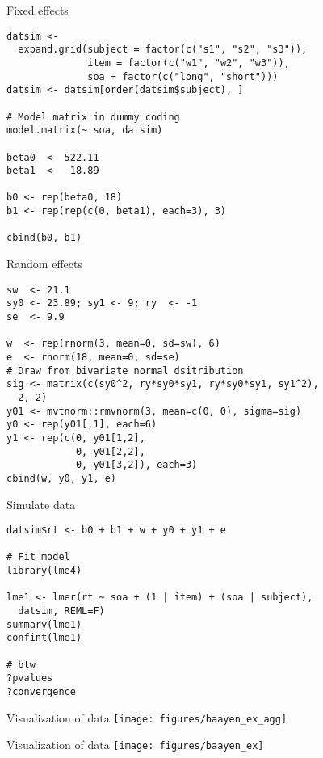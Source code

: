 \documentclass{beamer}
\begin{document}
{

\begin{frame}[fragile]{Fixed effects}
  \begin{lstlisting}
datsim <- 
  expand.grid(subject = factor(c("s1", "s2", "s3")),
              item = factor(c("w1", "w2", "w3")),
              soa = factor(c("long", "short")))
datsim <- datsim[order(datsim$subject), ]

# Model matrix in dummy coding
model.matrix(~ soa, datsim)

beta0  <- 522.11
beta1  <- -18.89

b0 <- rep(beta0, 18)
b1 <- rep(rep(c(0, beta1), each=3), 3)

cbind(b0, b1)
  \end{lstlisting}
\end{frame}

\begin{frame}[fragile]{Random effects}
  \begin{lstlisting}
sw  <- 21.1
sy0 <- 23.89; sy1 <- 9; ry  <- -1
se  <- 9.9

w  <- rep(rnorm(3, mean=0, sd=sw), 6)
e  <- rnorm(18, mean=0, sd=se)
# Draw from bivariate normal dsitribution
sig <- matrix(c(sy0^2, ry*sy0*sy1, ry*sy0*sy1, sy1^2),
  2, 2)
y01 <- mvtnorm::rmvnorm(3, mean=c(0, 0), sigma=sig)
y0 <- rep(y01[,1], each=6)
y1 <- rep(c(0, y01[1,2],
            0, y01[2,2],
            0, y01[3,2]), each=3)
cbind(w, y0, y1, e)
  \end{lstlisting}
\end{frame}

\begin{frame}[fragile]{Simulate data}
  \begin{lstlisting}
datsim$rt <- b0 + b1 + w + y0 + y1 + e

# Fit model
library(lme4)

lme1 <- lmer(rt ~ soa + (1 | item) + (soa | subject),
  datsim, REML=F)
summary(lme1)
confint(lme1)

# btw
?pvalues
?convergence
  \end{lstlisting}
\end{frame}

}

\begin{frame}{Visualization of data}
  \centering
\texttt{[image: figures/baayen\_ex\_agg]}
\end{frame}

\begin{frame}{Visualization of data}
\texttt{[image: figures/baayen\_ex]}
\end{frame}
\end{document}
